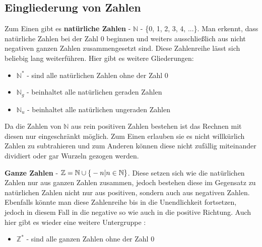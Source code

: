 \documentclass[german,12pt,a4paper]{article}
\begin{document}
\subsection{Eingliederung von Zahlen}
Zum Einen gibt es \textbf{natürliche Zahlen} - $\mathbb{N}$ - \{0, 1, 2, 3, 4, ...\}. Man erkennt, dass natürliche Zahlen bei der Zahl 0 beginnen und weiters ausschließlich aus nicht negativen ganzen Zahlen zusammengesetzt sind. Diese Zahlenreihe lässt sich beliebig lang weiterführen. Hier gibt es weitere Gliederungen:\
\begin{itemize}
\item $\mathbb{N}^*$ - sind alle natürlichen Zahlen ohne der Zahl 0
\item $\mathbb{N}_g$ - beinhaltet alle natürlichen geraden Zahlen
\item $\mathbb{N}_u$ - beinhaltet alle natürlichen ungeraden Zahlen
\end{itemize}
Da die Zahlen von $\mathbb{N}$ aus rein positiven Zahlen 
bestehen ist das Rechnen mit diesen nur eingeschränkt möglich. Zum Einen erlauben sie es nicht willkürlich Zahlen zu subtrahieren und zum Anderen können diese nicht zufällig miteinander dividiert oder gar Wurzeln gezogen werden.

\textbf{Ganze Zahlen} - $\mathbb{Z} = \mathbb{N} \cup \mathbb\{-n | n \in \mathbb{N}\}$. Diese setzen sich wie die natürlichen Zahlen nur aus 
ganzen Zahlen zusammen, jedoch bestehen diese im Gegensatz zu natürlichen Zahlen nicht nur aus %
positiven, sondern auch aus negativen Zahlen. Ebenfalls könnte man diese Zahlenreihe bis in die Unendlichkeit fortsetzen, %
jedoch in diesem Fall in die negative so wie auch in die positive Richtung. Auch hier gibt es wieder eine weitere Untergruppe %
:\
\begin{itemize}
\item $\mathbb{Z}^*$ - sind alle ganzen Zahlen ohne der Zahl 0
\end{itemize}
\end{document}
